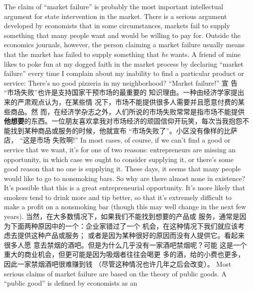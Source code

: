 \begin{paracol}{2}
The claim of ``market failure'' is probably the most important
intellectual argument for state intervention in the market. There is a serious argument developed by economists that in
some circumstances, markets fail to supply something that
many people want and would be willing to pay for. Outside the
economics journals, however, the person claiming a market failure usually means that the market has failed to supply something that \textit{he} wants. A friend of mine likes to poke fun at my
dogged faith in the market process by declaring ``market failure'' every time I complain about my inability to find a particular product or service: There's no good pizzeria in my
neighborhood? ``Market failure!''
\switchcolumn
宣 告 “市场失败”也许是支持国家干预市场的最重要的
知识理由。一种由经济学家提出来的严肃观点认为，在某些情
况下，市场不能提供很多人需要并且愿意付费的某些商品。然
而，在经济学杂志之外，人们所说的市场失败常常是指市场不能提供\textbf{他想要}的东西。一位朋友喜欢拿我对市场经济的顽固信仰开玩笑，每次当我抱怨不能找到某种商品或服务的时候，他就宣布 “市场失败了”。小区没有像样的比萨店， “这是市场
失败啊!”
\switchcolumn*
In most cases, of course, if we can't find a good or service that
we want, it's for one of two reasons: entrepreneurs are missing
an opportunity, in which case we ought to consider supplying it,
or there's some good reason that no one is supplying it. These
days, it seems that many people would like to go to nonsmoking bars. So why are there almost none in existence? It's possible that this is a great entrepreneurial opportunity. It's more
likely that smokers tend to drink more and tip better, so that
it's extremely difficult to make a profit on a nonsmoking bar
(though this may well change in the next few years).
\switchcolumn
当然，在大多数情况下，如果我们不能找到想要的产品或
服务，通常是因为下面两种原因中的一个：企业家错过了一个
机会，在这种情况下我们就应该考虑去提供这种产品或服务；
或者是因为某种很好的原因而没有人提供它。看起来很多人愿
意去禁烟的酒吧。但是为什么几乎没有一家酒吧禁烟呢？可能
这是一个重大的商业机会，但更可能是因为吸烟者往往会喝更
多的酒，给的小费也更多，因此一家禁烟酒吧很难赚到钱
（尽管这种情况也许几年之后会改变）。
\switchcolumn*
Most serious claims of market failure are based on the theory
of public goods. A ``public good'' is defined by economists as an

\end{paracol}
